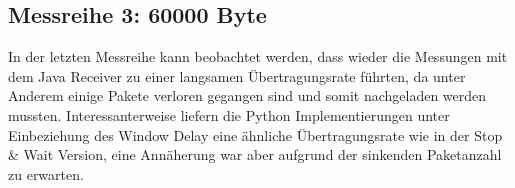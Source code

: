 \documentclass{article}
\begin{document}
    \begin{table}[]
        \caption{Paketlänge: 1400}
        \label{tab:my-tablev3_1400}
    \end{table}

    \subsection{Messreihe 3: 60000 Byte}
    In der letzten Messreihe kann beobachtet werden, dass wieder die Messungen mit dem Java Receiver zu einer
    langsamen Übertragungsrate führten, da unter Anderem einige Pakete verloren gegangen sind und somit
    nachgeladen werden mussten.
    Interessanterweise liefern die Python Implementierungen unter Einbeziehung des Window Delay eine ähnliche
    Übertragungsrate wie in der Stop \& Wait Version, eine Annäherung war aber aufgrund der sinkenden Paketanzahl zu
    erwarten.
\end{document}
